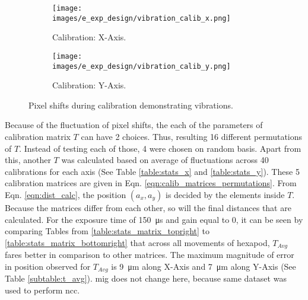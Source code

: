 \begin{figure}[h]
    \centering
    \begin{subfigure}{0.49\textwidth}
        \centering
        \texttt{[image: images/e\_exp\_design/vibration\_calib\_x.png]}
        \caption{Calibration: X-Axis.}
        \label{fig:vibration_calib_x.png}
    \end{subfigure}
    \begin{subfigure}{0.49\textwidth}
        \centering
        \texttt{[image: images/e\_exp\_design/vibration\_calib\_y.png]}
        \caption{Calibration: Y-Axis.}
        \label{fig:vibration_calib_y.png}
    \end{subfigure}
    \caption{Pixel shifts during calibration demonstrating vibrations.}
    \label{fig:vibration}
\end{figure}

\vspace{5mm}
\noindent Because of the fluctuation of pixel shifts, the each of the parameters of calibration matrix $T$ can have 2 choices. Thus, resulting 16 different permutations of $T$. Instead of testing each of those, 4 were chosen on random basis. Apart from this, another $T$ was calculated based on average of fluctuations across 40 calibrations for each axis (See Table \ref{table:stats_x} and \ref{table:stats_y}). These 5 calibration matrices are given in Eqn. \ref{eqn:calib_matrices_permutations}. From Eqn. \ref{eqn:dist_calc}, the position $(a_x, a_y)$ is decided by the elements inside $T$. Because the matrices differ from each other, so will the final distances that are calculated. For the exposure time of \SI{150}{\micro\second} and gain equal to $0$, it can be seen by comparing Tables from \ref{table:stats_matrix_topright} to \ref{table:stats_matrix_bottomright} that across all movements of hexapod, $T_{Avg}$ fares better in comparison to other matrices. The maximum magnitude of error in position observed for $T_{Avg}$ is \SI{9}{\micro\meter} along X-Axis and \SI{7}{\micro\meter} along Y-Axis (See Table \ref{subtable:t_avg}). \gls{mig} does not change here, because same dataset was used to perform \gls{ncc}.

